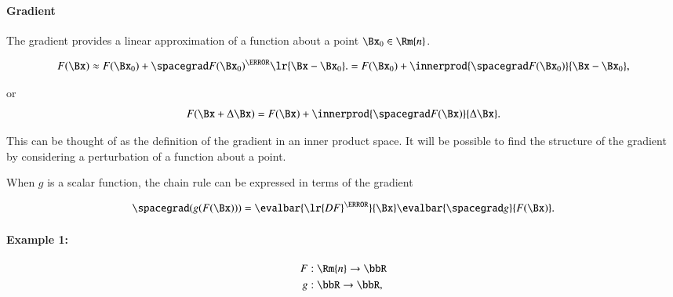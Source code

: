 
\paragraph{Gradient}

The gradient provides a linear approximation of a function about a point \( \Bx_0 \in \Rm{n} \).

\begin{dmath}\label{eqn:jacobianAndHessian:484}
F(\Bx)
\approx F(\Bx_0) + \spacegrad F(\Bx_0)^\T \lr{ \Bx - \Bx_0 }.
=
F(\Bx_0) + \innerprod{ \spacegrad F(\Bx_0)}{ \Bx - \Bx_0 },
\end{dmath}

or
\begin{equation}\label{eqn:jacobianAndHessian:504}
F(\Bx + \Delta \Bx)
=
F(\Bx) + \innerprod{ \spacegrad F(\Bx)}{ \Delta \Bx }.
\end{equation}

This can be thought of as the definition of the gradient in an inner product space.  It will be possible to find the structure of the gradient by considering a perturbation of a function about a point.

When \( g \) is a scalar function, the chain rule can be expressed in terms of the gradient

\begin{dmath}\label{eqn:jacobianAndHessian:724}
\spacegrad
(g(F(\Bx)))
=
\evalbar{\lr{
D F
}^\T}{\Bx}
\evalbar{\spacegrad g}{F(\Bx)}.
\end{dmath}


\paragraph{Example 1:}

\begin{dmath}\label{eqn:jacobianAndHessian:524}
\begin{aligned}
F &: \Rm{n} \rightarrow \bbR \\
g &: \bbR \rightarrow \bbR,
\end{aligned}
\end{dmath}

